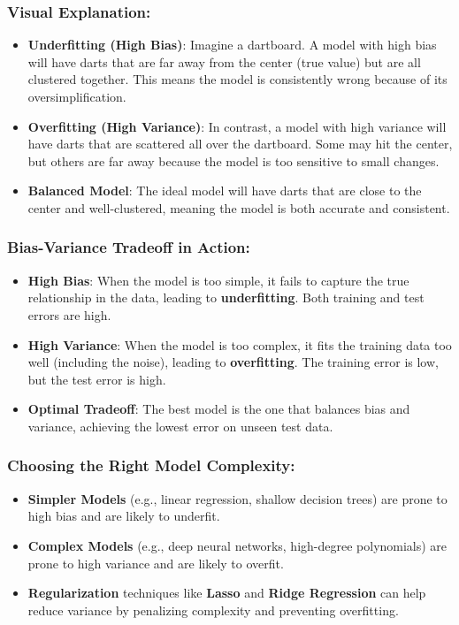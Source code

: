 \documentclass[12pt]{book}
\begin{document}
\subsubsection*{Visual Explanation:}
\begin{itemize}
    \item [-] \textbf{Underfitting (High Bias)}: Imagine a dartboard. A model with high bias will have darts that are far away from the center (true value) but are all clustered together. This means the model is consistently wrong because of its oversimplification.
    \item [-] \textbf{Overfitting (High Variance)}: In contrast, a model with high variance will have darts that are scattered all over the dartboard. Some may hit the center, but others are far away because the model is too sensitive to small changes.
    \item [-] \textbf{Balanced Model}: The ideal model will have darts that are close to the center and well-clustered, meaning the model is both accurate and consistent.
\end{itemize}


\subsubsection*{Bias-Variance Tradeoff in Action:}

\begin{itemize}
    \item [-] \textbf{High Bias}: When the model is too simple, it fails to capture the true relationship in the data, leading to \textbf{underfitting}. Both training and test errors are high.
    \item [-] \textbf{High Variance}: When the model is too complex, it fits the training data too well (including the noise), leading to \textbf{overfitting}. The training error is low, but the test error is high.
    \item [-] \textbf{Optimal Tradeoff}: The best model is the one that balances bias and variance, achieving the lowest error on unseen test data.
\end{itemize}


\subsubsection*{Choosing the Right Model Complexity:}

\begin{itemize}
    \item [-] \textbf{Simpler Models} (e.g., linear regression, shallow decision trees) are prone to high bias and are likely to underfit.
    \item [-] \textbf{Complex Models} (e.g., deep neural networks, high-degree polynomials) are prone to high variance and are likely to overfit.
    \item [-] \textbf{Regularization} techniques like \textbf{Lasso} and \textbf{Ridge Regression} can help reduce variance by penalizing complexity and preventing overfitting.
\end{itemize}
\end{document}
